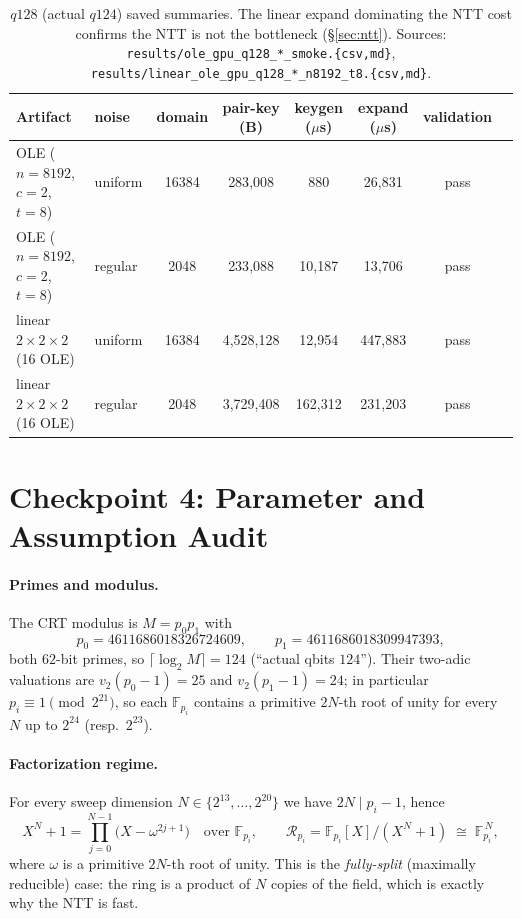 \documentclass[11pt]{article}
\newcommand{\F}{\mathbb{F}}
\newcommand{\R}{\mathcal{R}}
\newcommand{\SPFSS}{\mathsf{SPFSS}}
\begin{document}
\begin{table}[h]
\centering\small
\begin{tabular}{llcccccc}
\toprule
Artifact & noise & \SPFSS{} domain & pair-key (B) & keygen ($\mu$s) & expand ($\mu$s) & validation \\
\midrule
OLE ($n{=}8192$, $c{=}2$, $t{=}8$)        & uniform & 16384 & 283{,}008   & 880    & 26{,}831  & pass \\
OLE ($n{=}8192$, $c{=}2$, $t{=}8$)        & regular & 2048  & 233{,}088   & 10{,}187 & 13{,}706 & pass \\
linear $2{\times}2{\times}2$ (16 OLE)     & uniform & 16384 & 4{,}528{,}128 & 12{,}954 & 447{,}883 & pass \\
linear $2{\times}2{\times}2$ (16 OLE)     & regular & 2048  & 3{,}729{,}408 & 162{,}312 & 231{,}203 & pass \\
\bottomrule
\end{tabular}
\caption{$q128$ (actual $q124$) saved summaries. The linear expand dominating the
NTT cost confirms the NTT is not the bottleneck (\S\ref{sec:ntt}). Sources:
\texttt{results/ole\_gpu\_q128\_*\_smoke.\{csv,md\}},
\texttt{results/linear\_ole\_gpu\_q128\_*\_n8192\_t8.\{csv,md\}}.}
\label{tab:q128}
\end{table}

\section{Checkpoint 4: Parameter and Assumption Audit}
\label{sec:audit}

\paragraph{Primes and modulus.} The CRT modulus is $M=p_0p_1$ with
\[
  p_0 = 4611686018326724609,\qquad p_1 = 4611686018309947393,
\]
both $62$-bit primes, so $\lceil\log_2 M\rceil = 124$ (``actual qbits $124$'').
Their two-adic valuations are $v_2(p_0-1)=25$ and $v_2(p_1-1)=24$; in particular
$p_i\equiv 1\pmod{2^{21}}$, so each $\F_{p_i}$ contains a primitive $2N$-th root
of unity for every $N$ up to $2^{24}$ (resp.\ $2^{23}$).

\paragraph{Factorization regime.} For every sweep dimension
$N\in\{2^{13},\dots,2^{20}\}$ we have $2N\mid p_i-1$, hence
\[
  X^N+1 = \prod_{j=0}^{N-1}\bigl(X-\omega^{2j+1}\bigr)\quad\text{over }\F_{p_i},
  \qquad \R_{p_i}=\F_{p_i}[X]/(X^N+1)\;\cong\;\F_{p_i}^{\,N},
\]
where $\omega$ is a primitive $2N$-th root of unity. This is the
\emph{fully-split} (maximally reducible) case: the ring is a product of $N$
copies of the field, which is exactly why the NTT is fast.
\end{document}
